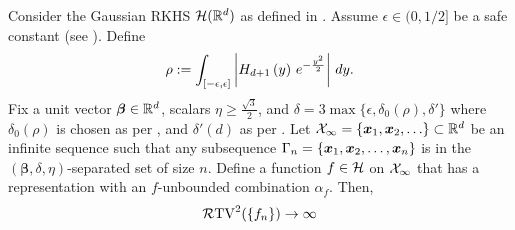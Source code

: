 \begin{theorem}\label{thm: unbounded}
    Consider the Gaussian RKHS ${\mathcal{H}}(\mathbb{R}^d)$ as defined in . Assume $\epsilon \in (0,1/2]$ be a safe constant (see ). Define \vspace{-2mm}
    \begin{align*}
        \rho :=  \int_{[-\epsilon,\epsilon]} \left| H_{d+1}\left( y \right) \, e^{ -\frac{y^2}{2} }\right| \, dy.\vspace{-2mm}
    \end{align*}
    Fix a unit vector $\bm{\beta} \in \mathbb{R}^d$, scalars $\eta \ge \frac{\sqrt{3}}{2}$, and $\delta = 3\max\{\epsilon, \delta_0(\rho), \delta'\}$ where $\delta_0(\rho)$ is chosen as per , and $\delta'(d)$ as per . Let ${\mathcal{X}}_\infty = \left\{\bm{x}_1,\bm{x}_2,\ldots\right\} \subset \mathbb{R}^d$ be an infinite sequence such that any subsequence $\Gamma_n = \left\{\bm{x}_1,\bm{x}_2,\ldots, \bm{x}_n\right\}$ is in the $(\bm{\beta}, \delta, \eta)$-separated set of size $n$. Define a function $f \in {\mathcal{H}}$ on ${\mathcal{X}}_\infty$ that has a representation with an $f$-unbounded combination $\alpha_f$. Then,%
    \begin{align}
        \mathcal{R}\mathrm{TV}^2({\{f_n\}}) \to \infty
    \end{align}
\end{theorem}


